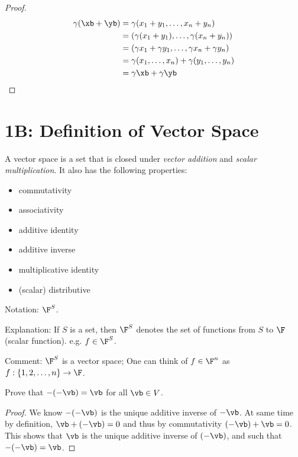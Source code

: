 \documentclass{extarticle}
\begin{document}
\begin{proof}
\begin{align*}
    \gamma(\xb + \yb)
    &= \gamma (x_1 + y_1, \ldots, x_n + y_n) \\ 
    &= (\gamma(x_1 + y_1), \ldots, \gamma(x_n + y_n)) \\ 
    &= (\gamma x_1 + \gamma y_1, \ldots, \gamma x_n + \gamma y_n) \\ 
    &= \gamma (x_1, \ldots, x_n) + \gamma(y_1, \ldots, y_n) \\ 
    &= \gamma \xb + \gamma \yb 
\end{align*}
\end{proof}

\newpage 

\section*{1B: Definition of Vector Space}

\begin{thm}
    A vector space is a set that is closed under \emph{vector addition} and \emph{scalar multiplication}. 
    It also has the following properties:
    \begin{itemize}
        \item commutativity 
        \item associativity 
        \item additive identity 
        \item additive inverse 
        \item multiplicative identity
        \item (scalar) distributive 
    \end{itemize}
\end{thm}

Notation: \(\F^S\). 

Explanation: If \(S\) is a set, then \(\F^S\) denotes the set of functions from \(S\) to \(\F\) (scalar
function). e.g. \(f \in \F^S\). 

Comment: \(\F^S\) is a vector space; One can think of \(f \in \F^n\) as \(f:
\{1, 2,\ldots, n\} \to \F\). 

\begin{problem}{1}
    Prove that \(-(-\vb) = \vb\) for all \(\vb \in V\). 
\end{problem}

\begin{proof}
We know \(- (-\vb)\) is the unique additive inverse of \(-\vb\). At same time by definition,
\(\vb + (-\vb) = 0\) and thus by commutativity \((-\vb) + \vb = 0\). This shows that \(\vb\)
is the unique additive inverse of \((-\vb)\), and such that \(-(-\vb) = \vb\). 
\end{proof}
\end{document}
